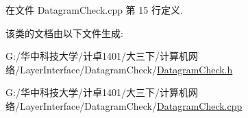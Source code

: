 在文件 Datagram\+Check.\+cpp 第 15 行定义.



该类的文档由以下文件生成\+:\begin{DoxyCompactItemize}
\item 
G\+:/华中科技大学/计卓1401/大三下/计算机网络/\+Layer\+Interface/\+Datagram\+Check/\hyperlink{_datagram_check_8h}{Datagram\+Check.\+h}\item 
G\+:/华中科技大学/计卓1401/大三下/计算机网络/\+Layer\+Interface/\+Datagram\+Check/\hyperlink{_datagram_check_8cpp}{Datagram\+Check.\+cpp}\end{DoxyCompactItemize}
